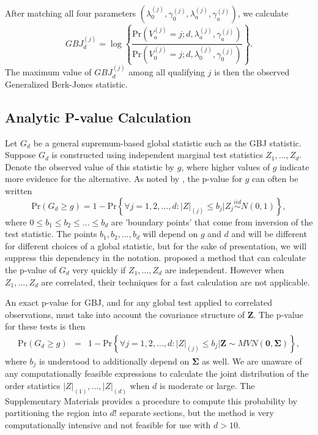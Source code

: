 \documentclass[12pt]{article}
\begin{document}
After matching all four parameters $(\lambda_{0}^{(j)},\gamma_{0}^{(j)}, \lambda_{a}^{(j)},\gamma_{a}^{(j)})$,
we calculate 
\[
GBJ_{d}^{(j)}=\log\left\{ \frac{\text{Pr}\left(V_{a}^{(j)}=j;d,\lambda_{a}^{(j)},\gamma_{a}^{(j)}\right)}{\text{Pr}\left(V_{0}^{(j)}=j;d,\lambda_{0}^{(j)},\gamma_{0}^{(j)}\right)}\right\}. 
\]
The maximum value of $GBJ_{d}^{(j)}$ among all qualifying $j$ is then the 
observed Generalized Berk-Jones statistic. 

\subsection{Analytic P-value Calculation}
\label{p2_ss:pvalue}

Let $G_{d}$ be a general supremum-based global statistic such as the GBJ statistic.
Suppose $G_d$ is constructed using independent marginal test statistics $Z_{1},...,Z_{d}$.
Denote the observed value of this statistic by $g$, where higher
values of $g$ indicate more evidence for the alternative.  
As noted by  \citet{boundary_crossing}, the p-value for $g$ can often be written
\[
\text{Pr}\left(G_{d}\geq g\right)=1-\text{Pr}\left\{ \forall j=1,2,...,d:|Z|_{(j)}\leq b_{j}\bigg|Z_{j}\overset{iid}{\sim}N(0,1)\right\}, 
\]
where $0\leq b_{1}\leq b_{2}\leq...\leq b_{d}$ are 'boundary points' that come from 
inversion of the test statistic.  
The points $b_{1},b_{2},...,b_{d}$ will depend on $g$ and $d$ and will be different for
different choices of a global statistic, but for the sake of presentation, 
we will suppress this dependency in the notation.
\citet{boundary_crossing} proposed a method that can calculate the p-value of $G_d$ very 
quickly if $Z_{1},...,Z_{d}$ are independent. 
However when $Z_{1},...,Z_{d}$ are correlated, their techniques for a fast calculation are not applicable. 

An exact p-value for GBJ, and for any global test applied to correlated
observations, must take into account the covariance structure of $\mathbf{Z}$.
The p-value for these tests is then
\begin{eqnarray}
\text{Pr}\left(G_{d}\geq g\right) & = & 1-\text{Pr}\left\{ \forall j=1,2,...,d:|Z|_{(j)}\leq b_{j}\bigg|\mathbf{Z}\sim MVN(\mathbf{0},\boldsymbol{\Sigma})\right\},
\label{p2_eq:exact_pvalue}
\end{eqnarray}
where $b_{j}$ is understood to additionally depend on $\boldsymbol{\Sigma}$ as well.
We are unaware of any computationally feasible expressions to calculate the joint distribution
of the order statistics $|Z|_{(1)},...,|Z|_{(d)}$ when $d$ is moderate or large. 
The Supplementary Materials provides a procedure to compute this probability by 
partitioning the region into $d!$ separate sections, but the method is very 
computationally intensive and not feasible for use with $d>10$.
\end{document}
